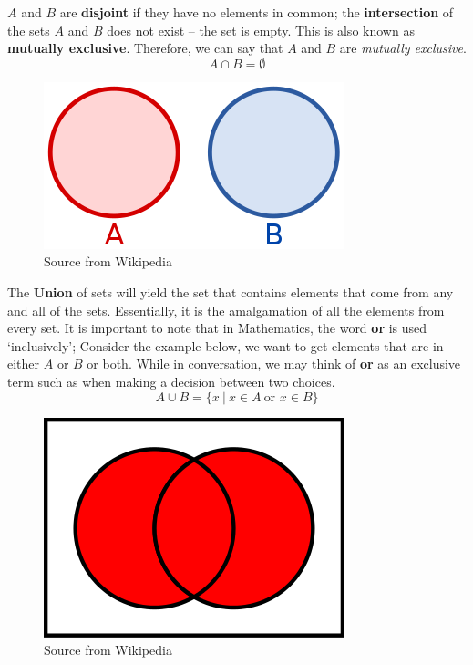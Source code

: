 \documentclass[../setup.tex]{subfiles}
\begin{document}
\begin{theorem}[Disjoint]
$A$ and $B$ are \textbf{disjoint} if they have no elements in common; the \textbf{intersection} of the sets $A$ and $B$ does not exist -- the set is empty. This is also known as \textbf{mutually exclusive}. Therefore, we can say that $A$ and $B$ are \textit{mutually exclusive}.
\[A\cap B = \emptyset\]
\begin{figure}[H]
    \centering
    \includegraphics[scale=0.6]{Venn Diagram-Disjoint.png}
    \caption{Source from Wikipedia}
\end{figure}
\end{theorem}


\begin{theorem}
The \textbf{Union} of sets will yield the set that contains elements that come from any and all of the sets. Essentially, it is the amalgamation of all the elements from every set. It is important to note that in Mathematics, the word \textbf{or} is used `inclusively'; Consider the example below, we want to get elements that are in either $A$ or $B$ or both. While in conversation, we may think of \textbf{or} as an exclusive term such as when making a decision between two choices.
\[A\cup B = \{x\ |\ x\in A\ \text{or } x\in B \}\]
\begin{figure}[H]
    \centering
    \includegraphics[scale=0.6]{Venn Diagram-Union.png}
    \caption{Source from Wikipedia}
\end{figure}
\end{theorem}
\end{document}
